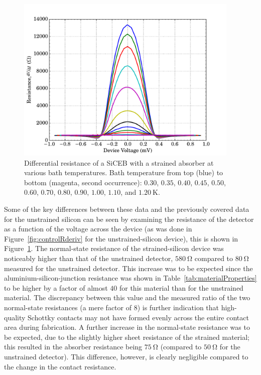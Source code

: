 \par 
\begin{figure}[tb]
\begin{center}
\includegraphics[width = 0.95\textwidth]{figures/strained_Rderiv}
\caption[Differential resistance of a SiCEB with a strained absorber]{Differential resistance of a SiCEB with a strained absorber at various bath temperatures. Bath temperature from top (blue) to bottom (magenta, second occurrence): $0.30$, $0.35$, $0.40$, $0.45$, $0.50$, $0.60$, $0.70$, $0.80$, $0.90$, $1.00$, $1.10$, and $1.20~\mathrm{K}$.}
\label{fig:strainedRderiv}
\end{center}
\end{figure}
Some of the key differences between these data and the previously covered data for the unstrained silicon can be seen by examining the resistance of the detector as a function of the voltage across the device (as was done in Figure~\ref{fig:controlRderiv} for the unstrained-silicon device), this is shown in Figure~\ref{fig:strainedRderiv}. The normal-state resistance of the strained-silicon device was noticeably higher than that of the unstrained detector, $580~\mathrm{\Omega}$ compared to $80~\mathrm{\Omega}$ measured for the unstrained detector. This increase was to be expected since the aluminium-silicon-junction resistance was shown in Table~\ref{tab:materialProperties} to be higher by a factor of almost $40$ for this material than for the unstrained material. The discrepancy between this value and the measured ratio of the two normal-state resistances (a mere factor of $8$) is further indication that high-quality Schottky contacts may not have formed evenly across the entire contact area during fabrication. A further increase in the normal-state resistance was to be expected, due to the slightly higher sheet resistance of the strained material; this resulted in the absorber resistance being $75~\mathrm{\Omega}$ (compared to $50~\mathrm{\Omega}$ for the unstrained detector). This difference, however, is clearly negligible compared to the change in the contact resistance.
